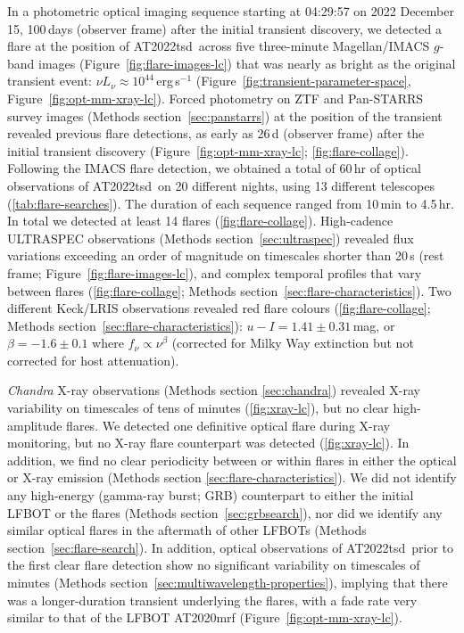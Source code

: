 \documentclass{nature_plusfigure}
\newcommand{\at}{AT2022tsd}
\begin{document}
In a photometric optical imaging sequence starting at 04:29:57 on 2022 December 15, 100\,days (observer frame) after the initial transient discovery, we detected\cite{Ho2022_Astronote_Flares} a flare at the position of \at\ across five three-minute Magellan/IMACS $g$-band images (Figure~\ref{fig:flare-images-lc}) that was nearly as bright as the original transient event: $\nu L_\nu \approx 10^{44}\,$erg\,s$^{-1}$ (Figure~\ref{fig:transient-parameter-space}, Figure~\ref{fig:opt-mm-xray-lc}).
Forced photometry on ZTF and Pan-STARRS survey images (Methods section~\ref{sec:panstarrs}) at the position of the transient revealed previous flare detections, as early as 26\,d (observer frame) after the initial transient discovery (Figure~\ref{fig:opt-mm-xray-lc}; \ref{fig:flare-collage}).
Following the IMACS flare detection, we obtained a total of 60\,hr of optical observations of \at\ on 20 different nights, using 13 different telescopes (\ref{tab:flare-searches}). The duration of each sequence ranged from 10\,min to 4.5\,hr. In total we detected at least 14 flares (\ref{fig:flare-collage}). High-cadence ULTRASPEC observations (Methods section~\ref{sec:ultraspec}) revealed flux variations exceeding an order of magnitude on timescales shorter than 20\,s (rest frame; Figure~\ref{fig:flare-images-lc}), and complex temporal profiles that vary between flares (\ref{fig:flare-collage}; Methods section~\ref{sec:flare-characteristics}).
Two different Keck/LRIS observations revealed red flare colours (\ref{fig:flare-collage}; Methods section~\ref{sec:flare-characteristics}):
$u-I=1.41\pm0.31\,$mag, or $\beta=-1.6\pm0.1$ where
$f_\nu \propto \nu^{\beta}$ (corrected for Milky Way extinction but not corrected for host attenuation).

\emph{Chandra} X-ray observations\cite{Matthews2022} (Methods section \ref{sec:chandra}) revealed X-ray variability on timescales of tens of minutes (\ref{fig:xray-lc}), but no clear high-amplitude flares. 
We detected one definitive optical flare during X-ray monitoring, but no X-ray flare counterpart was detected (\ref{fig:xray-lc}).
In addition, we find no clear periodicity between or within flares in either the optical or X-ray emission (Methods section \ref{sec:flare-characteristics}).
We did not identify any high-energy (gamma-ray burst; GRB) counterpart to either the initial LFBOT or the flares (Methods section~\ref{sec:grbsearch}), nor did we identify any similar optical flares in the aftermath of other LFBOTs (Methods section~\ref{sec:flare-search}).
In addition, optical observations of \at\ prior to the first clear flare detection show no significant variability on timescales of minutes (Methods section~\ref{sec:multiwavelength-properties}), implying that there was a longer-duration transient underlying the flares, with a fade rate very similar to that of the LFBOT AT2020mrf\cite{Yao2022} (Figure~\ref{fig:opt-mm-xray-lc}).
\end{document}
